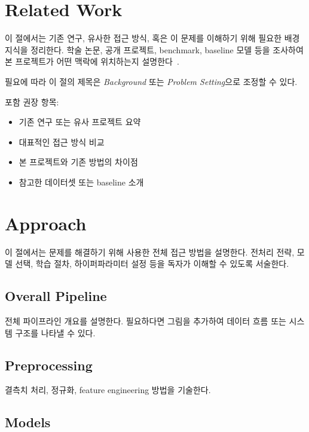 \documentclass[10pt,a4paper,twocolumn]{article}
\begin{document}
\section{Related Work}

이 절에서는 기존 연구, 유사한 접근 방식, 혹은 이 문제를 이해하기 위해 필요한
배경지식을 정리한다. 학술 논문, 공개 프로젝트, benchmark, baseline 모델 등을 조사하여
본 프로젝트가 어떤 맥락에 위치하는지 설명한다~\cite{breiman2001random, chen2016xgboost}.

필요에 따라 이 절의 제목은 \emph{Background} 또는 \emph{Problem Setting}으로
조정할 수 있다.

포함 권장 항목:
\begin{itemize}
  \item 기존 연구 또는 유사 프로젝트 요약
  \item 대표적인 접근 방식 비교
  \item 본 프로젝트와 기존 방법의 차이점
  \item 참고한 데이터셋 또는 baseline 소개
\end{itemize}

\section{Approach}

이 절에서는 문제를 해결하기 위해 사용한 전체 접근 방법을 설명한다. 전처리 전략,
모델 선택, 학습 절차, 하이퍼파라미터 설정 등을 독자가 이해할 수 있도록 서술한다.

\subsection{Overall Pipeline}

전체 파이프라인 개요를 설명한다. 필요하다면 그림을 추가하여 데이터 흐름 또는
시스템 구조를 나타낼 수 있다.

\subsection{Preprocessing}

결측치 처리, 정규화, feature engineering 방법을 기술한다.

\subsection{Models}
\end{document}
